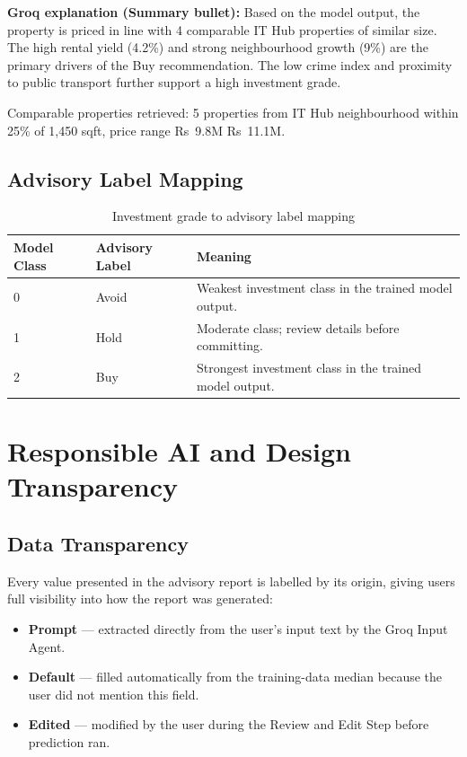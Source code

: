 \documentclass[12pt,a4paper]{article}
\begin{document}
\noindent\textbf{Groq explanation (Summary bullet):} Based on the model output, the property is priced in line with 4 comparable IT Hub properties of similar size. The high rental yield (4.2\%) and strong neighbourhood growth (9\%) are the primary drivers of the Buy recommendation. The low crime index and proximity to public transport further support a high investment grade.

\noindent Comparable properties retrieved: 5 properties from IT Hub neighbourhood within 25\% of 1,450 sqft, price range Rs~9.8M \textendash{} Rs~11.1M.

\subsection{Advisory Label Mapping}

\begin{table}[H]
\centering
\caption{Investment grade to advisory label mapping}
\renewcommand{\arraystretch}{1.25}
\begin{tabular}{lll}
\toprule
\textbf{Model Class} & \textbf{Advisory Label} & \textbf{Meaning} \\
\midrule
0 & Avoid & Weakest investment class in the trained model output. \\
1 & Hold  & Moderate class; review details before committing. \\
2 & Buy   & Strongest investment class in the trained model output. \\
\bottomrule
\end{tabular}
\end{table}

\section{Responsible AI and Design Transparency}

\subsection{Data Transparency}

Every value presented in the advisory report is labelled by its origin, giving users full visibility into how the report was generated:
\begin{itemize}[itemsep=3pt]
  \item \textbf{Prompt} --- extracted directly from the user's input text by the Groq Input Agent.
  \item \textbf{Default} --- filled automatically from the training-data median because the user did not mention this field.
  \item \textbf{Edited} --- modified by the user during the Review and Edit Step before prediction ran.
\end{itemize}
\end{document}
